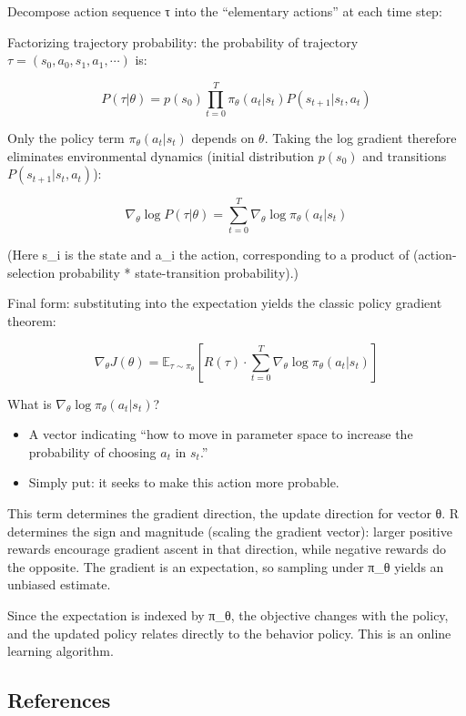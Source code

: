 Decompose action sequence τ into the ``elementary actions'' at each time step:

Factorizing trajectory probability: the probability of trajectory \(\tau=(s_0,a_0,s_1,a_1,\cdots)\) is:

\[
P(\tau|\theta)=p(s_0)\prod_{t=0}^{T}\pi_\theta(a_t|s_t)P(s_{t+1}|s_t,a_t)
\]

Only the policy term \(\pi_\theta(a_t|s_t)\) depends on \(\theta\). Taking the log gradient therefore eliminates environmental dynamics (initial distribution \(p(s_0)\) and transitions \(P(s_{t+1}|s_t,a_t)\)):

\[
\nabla_\theta\log P(\tau|\theta)=\sum_{t=0}^{T}\nabla_\theta\log\pi_\theta(a_t|s_t)
\]

(Here s\_i is the state and a\_i the action, corresponding to a product of (action-selection probability * state-transition probability).)

Final form: substituting into the expectation yields the classic policy gradient theorem:

\[
\nabla_\theta J(\theta)
=\mathbb{E}_{\tau\sim\pi_\theta}
\left[
R(\tau)\cdot\sum_{t=0}^{T}\nabla_\theta\log\pi_\theta(a_t|s_t)
\right]
\]

What is \(\nabla_\theta\log\pi_\theta(a_t|s_t)\)?

\begin{itemize}
\tightlist
\item
  A vector indicating ``how to move in parameter space to increase the probability of choosing \(a_t\) in \(s_t\).''
\item
  Simply put: it seeks to make this action more probable.
\end{itemize}

This term determines the gradient direction, the update direction for vector θ. R determines the sign and magnitude (scaling the gradient vector): larger positive rewards encourage gradient ascent in that direction, while negative rewards do the opposite. The gradient is an expectation, so sampling under π\_θ yields an unbiased estimate.

Since the expectation is indexed by π\_θ, the objective changes with the policy, and the updated policy relates directly to the behavior policy. This is an online learning algorithm.

\FloatBarrier
{}
\hypertarget{references-54}{%
\subsection{References}\label{references-54}}

